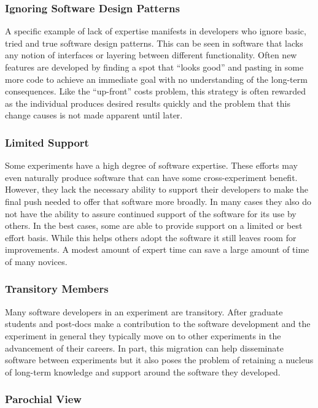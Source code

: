 \subsubsection{Ignoring Software Design Patterns}

A specific example of lack of expertise manifests in developers who
ignore basic, tried and true software design patterns.  This can be
seen in software that lacks any notion of interfaces or layering
between different functionality.  Often new features are developed by
finding a spot that ``looks good'' and pasting in some more code to
achieve an immediate goal with no understanding of the long-term consequences.
Like the ``up-front'' costs problem, this strategy is often rewarded as the
individual produces desired results quickly and the problem that this change
causes is not made apparent until later.

\subsubsection{Limited Support}

Some experiments have a high degree of software expertise.  These
efforts may even naturally produce software that can have some
cross-experiment benefit.  However, they lack the necessary ability to
support their developers to make the final push needed to offer that
software more broadly.  In many cases they also do not have the ability
to assure continued support of the software for its use by others.
In the best cases, some are able to provide support on a limited or best effort basis.  
While this helps others adopt the software it still leaves room
for improvements.  A modest amount of expert time can save a large amount of time of many novices.

\subsubsection{Transitory Members}

Many software developers in an experiment are transitory.  After
graduate students and post-docs make a contribution to the software
development and the experiment in general they typically move on to
other experiments in the advancement of their careers.  In part, this migration
can help disseminate software between experiments but it also
poses the problem of retaining a nucleus of long-term knowledge and
support around the software they developed.

\subsubsection{Parochial View}


